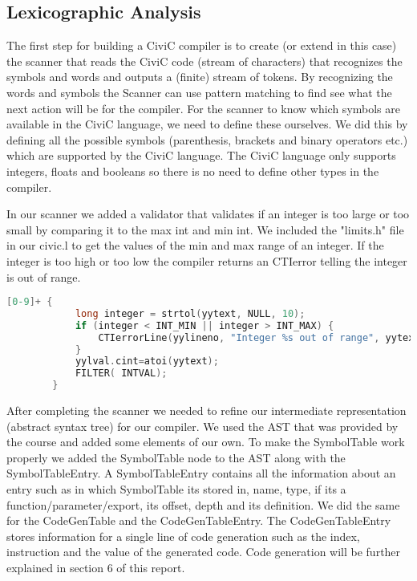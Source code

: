 \documentclass[hidelinks]{uva-inf-article}
\begin{document}
\subsection{Lexicographic Analysis}
The first step for building a CiviC compiler is to create (or extend in this case) 
the scanner that reads the CiviC code (stream of characters) that recognizes the 
symbols and words and outputs a (finite) stream of tokens.
By recognizing the words and symbols the Scanner can use pattern matching to find see
what the next action will be for the compiler. For the scanner to know which symbols
are available in the CiviC language, we need to define these ourselves. We did this 
by defining all the possible symbols (parenthesis, brackets and binary operators etc.)
which are supported by the CiviC language. The CiviC language only supports integers,
floats and booleans so there is no need to define other types in the compiler.

In our scanner we added a validator that validates if an integer is too large or too small by 
comparing it to the max int and min int. We included the "limits.h" file in our civic.l
to get the values of the min and max range of an integer. If the integer is too high or too low the compiler
returns an CTIerror telling the integer is out of range.

\begin{lstlisting}[basicstyle=\small, language=C, label=lst:code-1, caption=Integer range check, captionpos=b]
[0-9]+ { 
            long integer = strtol(yytext, NULL, 10);
            if (integer < INT_MIN || integer > INT_MAX) {
                CTIerrorLine(yylineno, "Integer %s out of range", yytext);
            }
            yylval.cint=atoi(yytext);
            FILTER( INTVAL);
        }
\end{lstlisting}

After completing the scanner we needed to refine our intermediate representation (abstract
syntax tree) for our compiler. We used the AST that was provided by the course and added some 
elements of our own. To make the SymbolTable work properly we added the SymbolTable node to the
AST along with the SymbolTableEntry. A SymbolTableEntry contains all the information about 
an entry such as in which SymbolTable its stored in, name, type, if its a function/parameter/export,
its offset, depth and its definition. We did the same for the CodeGenTable and the CodeGenTableEntry.
The CodeGenTableEntry stores information for a single line of code generation such as the
index, instruction and the value of the generated code. Code generation will be further 
explained in section 6 of this report.
\end{document}
